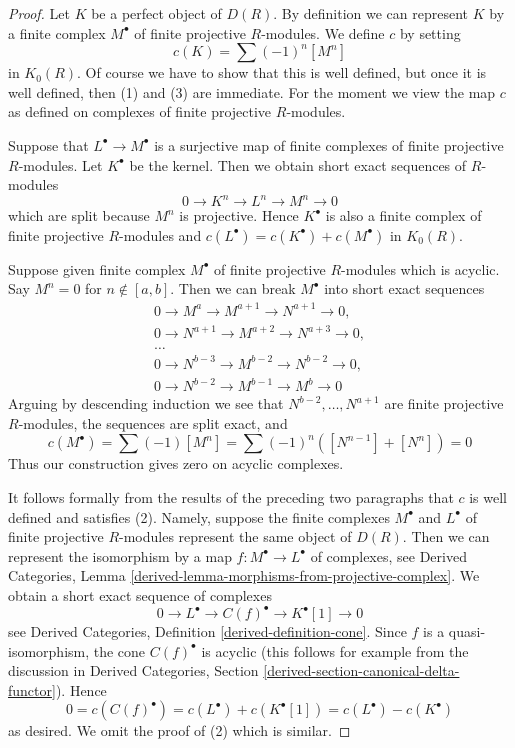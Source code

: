 \documentclass[10pt,a4paper]{amsart}
\theoremstyle{plain}
\theoremstyle{definition}
\theoremstyle{remark}
\numberwithin{equation}{subsection}
\begin{document}
\begin{proof}
Let $K$ be a perfect object of $D(R)$. By definition we can represent
$K$ by a finite complex $M^\bullet$ of finite projective $R$-modules.
We define $c$ by setting
$$
c(K) = \sum (-1)^n[M^n]
$$
in $K_0(R)$. Of course we have to show that this is well defined,
but once it is well defined, then (1) and (3) are immediate.
For the moment we view the map $c$ as defined on complexes of
finite projective $R$-modules.

\medskip\noindent
Suppose that $L^\bullet \to M^\bullet$ is a surjective map
of finite complexes of finite projective $R$-modules.
Let $K^\bullet$ be the kernel. Then we obtain short exact
sequences of $R$-modules
$$
0 \to K^n \to L^n \to M^n \to 0
$$
which are split because $M^n$ is projective. Hence $K^\bullet$
is also a finite complex of finite projective $R$-modules and
$c(L^\bullet) = c(K^\bullet) + c(M^\bullet)$ in $K_0(R)$.

\medskip\noindent
Suppose given finite complex $M^\bullet$ of finite projective $R$-modules
which is acyclic. Say $M^n = 0$ for $n \not \in [a, b]$. Then we
can break $M^\bullet$ into short exact sequences
$$
\begin{matrix}
0 \to M^a \to M^{a + 1} \to N^{a + 1} \to 0, \\
0 \to N^{a + 1} \to M^{a + 2} \to N^{a + 3} \to 0, \\
\ldots \\
0 \to N^{b - 3} \to M^{b - 2} \to N^{b - 2} \to 0, \\
0 \to N^{b - 2} \to M^{b - 1} \to M^b \to 0
\end{matrix}
$$
Arguing by descending induction we see that $N^{b - 2}, \ldots, N^{a + 1}$
are finite projective $R$-modules, the sequences are split exact, and
$$
c(M^\bullet) = \sum (-1)[M^n] = \sum (-1)^n([N^{n - 1}] + [N^n]) = 0
$$
Thus our construction gives zero on acyclic complexes.

\medskip\noindent
It follows formally from the results of the preceding two
paragraphs that $c$ is well defined and satisfies (2). Namely,
suppose the finite complexes $M^\bullet$ and $L^\bullet$ of
finite projective $R$-modules represent the same object
of $D(R)$. Then we can represent the isomorphism by a map
$f : M^\bullet \to L^\bullet$ of complexes, see
Derived Categories, Lemma \ref{derived-lemma-morphisms-from-projective-complex}.
We obtain a short exact sequence of complexes
$$
0 \to L^\bullet \to C(f)^\bullet \to K^\bullet[1] \to 0
$$
see Derived Categories, Definition \ref{derived-definition-cone}.
Since $f$ is a quasi-isomorphism, the cone $C(f)^\bullet$ is
acyclic (this follows for example from the discussion in
Derived Categories, Section \ref{derived-section-canonical-delta-functor}).
Hence
$$
0 = c(C(f)^\bullet) = c(L^\bullet) + c(K^\bullet[1]) =
c(L^\bullet) - c(K^\bullet)
$$
as desired. We omit the proof of (2) which is similar.
\end{proof}
\end{document}
